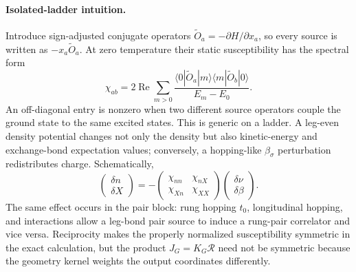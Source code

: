 \documentclass[11pt]{article}
\begin{document}
\paragraph{Isolated-ladder intuition.}
Introduce sign-adjusted conjugate operators
\(\widetilde O_a=-\partial H/\partial x_a\), so every source is written as
\(-x_a\widetilde O_a\).  At zero temperature their static susceptibility has
the spectral form
\begin{equation}
 \chi_{ab}
 =2\operatorname{Re}\sum_{m>0}
 \frac{\langle0|\widetilde O_a|m\rangle
       \langle m|\widetilde O_b|0\rangle}
      {E_m-E_0}.
 \label{eq:spectral-susceptibility}
\end{equation}
An off-diagonal entry is nonzero when two different source operators couple the
ground state to the same excited states.  This is generic on a ladder.  A
leg-even density potential changes not only the density but also kinetic-energy
and exchange-bond expectation values; conversely, a hopping-like
\(\beta_\sigma\) perturbation redistributes charge.  Schematically,
\begin{equation}
 \begin{pmatrix}\delta n\\ \delta X\end{pmatrix}
 =-
 \begin{pmatrix}
   \chi_{nn} & \chi_{nX}\\
   \chi_{Xn} & \chi_{XX}
 \end{pmatrix}
 \begin{pmatrix}\delta\nu\\ \delta\beta\end{pmatrix}.
 \label{eq:normal-response-mixing}
\end{equation}
The same effect occurs in the pair block: rung hopping \(t_0\), longitudinal
hopping, and interactions allow a leg-bond pair source to induce a rung-pair
correlator and vice versa.  Reciprocity makes the properly normalized
susceptibility symmetric in the exact calculation, but the product
\(J_G=K_G\mathcal R\) need not be symmetric because the geometry kernel weights
the output coordinates differently.
\end{document}
